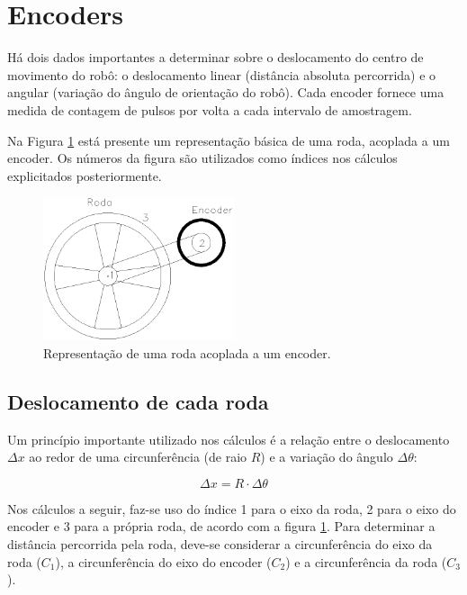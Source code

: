\section{Encoders}

Há dois dados importantes a determinar sobre o deslocamento do centro de movimento do robô: o deslocamento linear (distância absoluta percorrida) e o angular (variação do ângulo de orientação do robô). Cada encoder fornece uma medida de contagem de pulsos por volta a cada intervalo de amostragem. 

Na Figura \ref{fig:roda_encoder} está presente um representação básica de uma roda, acoplada a um encoder. Os números da figura são utilizados como índices nos cálculos explicitados posteriormente.

\begin{figure}[H]
  \centering
  \includegraphics[width=0.5\textwidth, keepaspectratio]{./figuras/robo/roda_encoder.png}
  \caption{Representação de uma roda acoplada a um encoder.}
  \label{fig:roda_encoder}
\end{figure}

\subsection{Deslocamento de cada roda}

Um princípio importante utilizado nos cálculos é a relação entre o deslocamento $\Delta x$ ao redor de uma circunferência (de raio $R$) e a variação do ângulo $\Delta \theta$:

\begin{equation}
  \Delta x = R \cdot \Delta \theta
  \label{eq:deslocamento_circunferencia}
\end{equation}

Nos cálculos a seguir, faz-se uso do índice 1 para o eixo da roda, 2 para o eixo do encoder e 3 para a própria roda, de acordo com a figura \ref{fig:roda_encoder}. Para determinar a distância percorrida pela roda, deve-se considerar a circunferência do eixo da roda ($C_1$), a circunferência do eixo do encoder ($C_2$) e a circunferência da roda ($C_3$).

